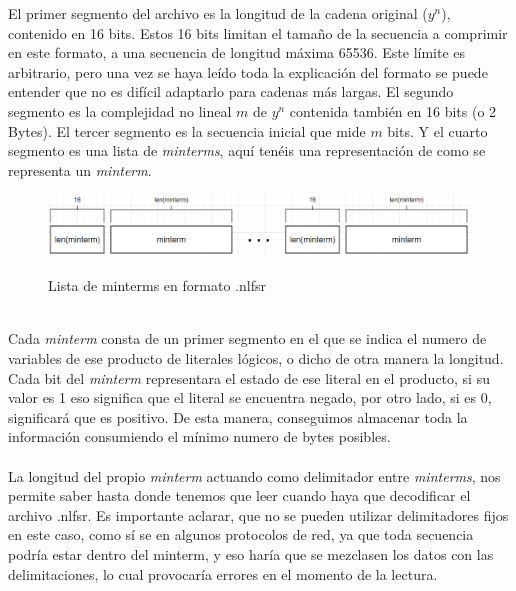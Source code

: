 \noindent El primer segmento del archivo es la longitud de la cadena original ($y^n$), contenido en 16 bits. Estos 16 bits limitan el tamaño de la secuencia a comprimir en este formato, a una secuencia de longitud máxima 65536. Este límite es arbitrario, pero una vez se haya leído toda la explicación del formato se puede entender que no es difícil adaptarlo para cadenas más largas.  El segundo segmento es la complejidad no lineal $m$ de $y^n$ contenida también en 16 bits (o 2 Bytes). El tercer segmento es la secuencia inicial que mide $m$ bits. Y el cuarto segmento es una lista de \textit{minterms}, aquí tenéis una representación de como se representa un \textit{minterm}.
\begin{figure}[h] %
    \centering
    \includegraphics[width=\textwidth,keepaspectratio]{img/nlfsrformat_02.png} %
    \parbox{\linewidth}{\centering Lista de minterms en formato .nlfsr}
    \label{fig:mi_imagen} %
\end{figure}\\
\noindent Cada \textit{minterm} consta de un primer segmento en el que se indica el numero de variables de ese producto de literales lógicos, o dicho de otra manera la longitud. Cada bit del \textit{minterm} representara el estado de ese literal en el producto, si su valor es 1 eso significa que el literal se encuentra negado, por otro lado, si es 0, significará que es positivo. De esta manera, conseguimos almacenar toda la información consumiendo el mínimo numero de bytes posibles. \\\\
La longitud del propio \textit{minterm} actuando como delimitador entre \textit{minterms}, nos permite saber hasta donde tenemos que leer cuando haya que decodificar el archivo .nlfsr. Es importante aclarar, que no se pueden utilizar delimitadores fijos en este caso, como sí se en algunos protocolos de red, ya que toda secuencia podría estar dentro del minterm, y eso haría que se mezclasen los datos con las delimitaciones, lo cual provocaría errores en el momento de la lectura.
\\\\
